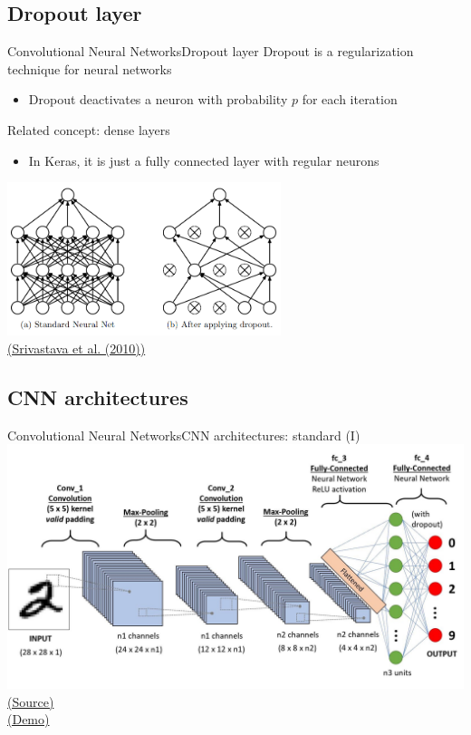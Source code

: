 \documentclass[10pt,compress]{beamer} %
\begin{document}
\subsection{Dropout layer}
\begin{frame}{Convolutional Neural Networks}{Dropout layer}
	\alert{Dropout} is a regularization technique for neural networks
	\begin{itemize}
		\item Dropout deactivates a neuron with probability $p$ for each iteration
	\end{itemize}

	Related concept: \alert{dense layers}
	\begin{itemize}
		\item In Keras, it is just a fully connected layer with regular neurons
	\end{itemize}

	\centering
        \includegraphics[width=0.6\textwidth]{figs/dropout.png}\\
	\scriptsize\href{https://jmlr.org/papers/volume15/srivastava14a.old/srivastava14a.pdf}{(Srivastava et al. (2010))}
\end{frame}

\subsection{CNN architectures}
\begin{frame}{Convolutional Neural Networks}{CNN architectures: standard (I)}
	\centering
        \includegraphics[width=\textwidth]{figs/layers.png}\\
	    \scriptsize\href{https://towardsdatascience.com/a-comprehensive-guide-to-convolutional-neural-networks-the-eli5-way-3bd2b1164a53}{(Source)}\\

	\normalsize \href{https://poloclub.github.io/cnn-explainer/\#article-convolution}{(Demo)}
\end{frame}
\end{document}
